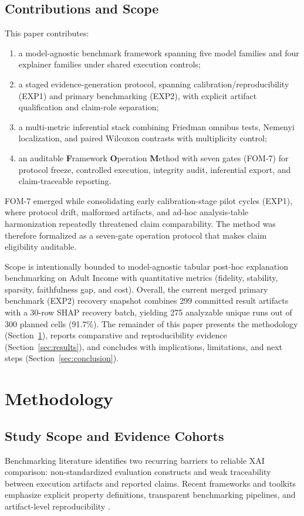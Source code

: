 \documentclass[twoside,11pt]{article}
\begin{document}
\subsection{Contributions and Scope}
This paper contributes:
\begin{enumerate}[leftmargin=*]
    \item a model-agnostic benchmark framework spanning five model families
    and four explainer families under shared execution controls;
    \item a staged evidence-generation protocol, spanning
    calibration/reproducibility (EXP1) and primary benchmarking (EXP2),
    with explicit artifact qualification and claim-role separation;
    \item a multi-metric inferential stack combining Friedman omnibus tests,
    Nemenyi localization, and paired Wilcoxon contrasts with multiplicity
    control;
    \item an auditable \textbf{F}ramework \textbf{O}peration \textbf{M}ethod
    with seven gates (FOM-7) for protocol freeze,
    controlled execution, integrity audit, inferential export, and
    claim-traceable reporting.
\end{enumerate}

FOM-7 emerged while consolidating early calibration-stage pilot cycles (EXP1), where
protocol drift, malformed artifacts, and ad-hoc analysis-table harmonization
repeatedly threatened claim comparability. The method was therefore formalized
as a seven-gate operation protocol that makes claim eligibility auditable.

Scope is intentionally bounded to model-agnostic tabular post-hoc explanation
benchmarking on Adult Income with quantitative metrics (fidelity, stability,
sparsity, faithfulness gap, and cost). Overall, the current merged
primary benchmark (EXP2) recovery snapshot combines 299 committed result
artifacts with a 30-row SHAP recovery batch, yielding 275 analyzable unique runs out of 300 planned cells
(91.7\%). The remainder of this
paper presents the methodology (Section~\ref{sec:methodology}), reports
comparative and reproducibility evidence (Section~\ref{sec:results}), and
concludes with implications, limitations, and next steps
(Section~\ref{sec:conclusion}).

\section{Methodology}
\label{sec:methodology}

\subsection{Study Scope and Evidence Cohorts}
\label{sec:methods-scope}
Benchmarking literature identifies two recurring barriers to reliable XAI
comparison: non-standardized evaluation constructs and weak traceability between
execution artifacts and reported claims. Recent frameworks and toolkits
emphasize explicit property definitions, transparent benchmarking pipelines, and
artifact-level reproducibility
\citep{canha2025functionally,agarwal2022openxai,sithakoul2024beexai,hedstrom2023quantus,adadi2018xai,arrieta2020xai}.
\end{document}
